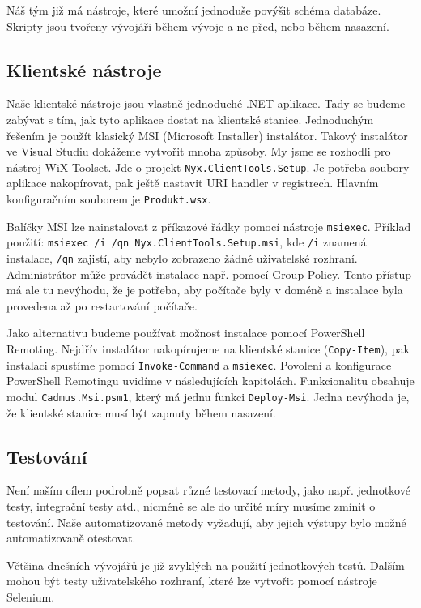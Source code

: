 Náš tým již má nástroje, které umožní jednoduše povýšit schéma databáze. Skripty jsou tvořeny vývojáři během vývoje a ne před, nebo během nasazení.

\subsection{Klientské nástroje}
Naše klientské nástroje jsou vlastně jednoduché .NET aplikace. Tady se budeme zabývat s tím, jak tyto aplikace dostat na klientské stanice. Jednoduchým řešením je použít klasický MSI (Microsoft Installer) instalátor. Takový instalátor ve Visual Studiu dokážeme vytvořit mnoha způsoby. My jsme se rozhodli pro nástroj WiX Toolset. Jde o projekt \texttt{Nyx.ClientTools.Setup}. Je potřeba soubory aplikace nakopírovat,  pak ještě nastavit URI handler v registrech. Hlavním konfiguračním souborem je \texttt{Produkt.wsx}.

Balíčky MSI lze nainstalovat z příkazové řádky pomocí nástroje \texttt{msiexec}. Příklad použití: \texttt{msiexec /i /qn Nyx.ClientTools.Setup.msi}, kde \texttt{/i} znamená instalace, \texttt{/qn} zajistí, aby nebylo zobrazeno žádné uživatelské rozhraní. Administrátor může provádět instalace např. pomocí Group Policy. Tento přístup má ale tu nevýhodu, že je potřeba, aby počítače byly v doméně a instalace byla provedena až po restartování počítače.

Jako alternativu budeme používat možnost instalace pomocí PowerShell Remoting. Nejdřív instalátor nakopírujeme na klientské stanice (\texttt{Copy-Item}), pak instalaci spustíme pomocí \texttt{Invoke-Command} a \texttt{msiexec}. Povolení a konfigurace PowerShell Remotingu uvidíme v následujících kapitolách. Funkcionalitu obsahuje modul \texttt{Cadmus.Msi.psm1}, který má jednu funkci \texttt{Deploy-Msi}. Jedna nevýhoda je, že klientské stanice musí být zapnuty během nasazení.

\subsection{Testování}
Není naším cílem podrobně popsat různé testovací metody, jako např. jednotkové testy, integrační testy atd., nicméně se ale do určité míry musíme zmínit o testování. Naše automatizované metody vyžadují, aby jejich výstupy bylo možné automatizovaně otestovat. 

Většina dnešních vývojářů je již zvyklých na použití jednotkových testů. Dalším mohou být testy uživatelského rozhraní, které lze vytvořit pomocí nástroje Selenium.

